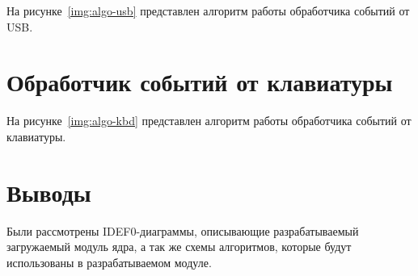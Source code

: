 На рисунке~\ref{img:algo-usb} представлен алгоритм работы обработчика событий от USB.



\section{Обработчик событий от клавиатуры}

На рисунке~\ref{img:algo-kbd} представлен алгоритм работы обработчика событий от клавиатуры.


\section*{Выводы}

Были рассмотрены IDEF0-диаграммы, описывающие разрабатываемый загружаемый модуль ядра, а так же схемы алгоритмов, которые будут использованы в разрабатываемом модуле.